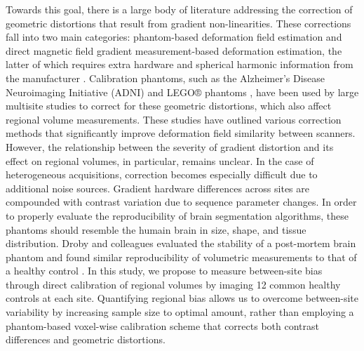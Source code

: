 Towards this goal, there is a large body of literature addressing the correction of geometric distortions that result from gradient non-linearities. These corrections fall into two main categories: phantom-based deformation field estimation and direct magnetic field gradient measurement-based deformation estimation, the latter of which requires extra hardware and spherical harmonic information from the manufacturer \cite{fonov2010improved}. Calibration phantoms, such as the Alzheimer's Disease Neuroimaging Initiative (ADNI) \cite{gunter2009measurement} and LEGO® phantoms \cite{caramanos2010gradient}, have been used by large multisite studies to correct for these geometric distortions, which also affect regional volume measurements. These studies have outlined various correction methods that significantly improve deformation field similarity between scanners. However, the relationship between the severity of gradient distortion and its effect on regional volumes, in particular, remains unclear. In the case of heterogeneous acquisitions, correction becomes especially difficult due to additional noise sources. Gradient hardware differences across sites are compounded with contrast variation due to sequence parameter changes. In order to properly evaluate the reproducibility of brain segmentation algorithms, these phantoms should resemble the humain brain in size, shape, and tissue distribution. Droby and colleagues evaluated the stability of a post-mortem brain phantom and found similar reproducibility of volumetric measurements to that of a healthy control \cite{droby2015human}. In this study, we propose to measure between-site bias through direct calibration of regional volumes by imaging 12 common healthy controls at each site. Quantifying regional bias allows us to overcome between-site variability by increasing sample size to optimal amount, rather than employing a phantom-based voxel-wise calibration scheme that corrects both contrast differences and geometric distortions. 